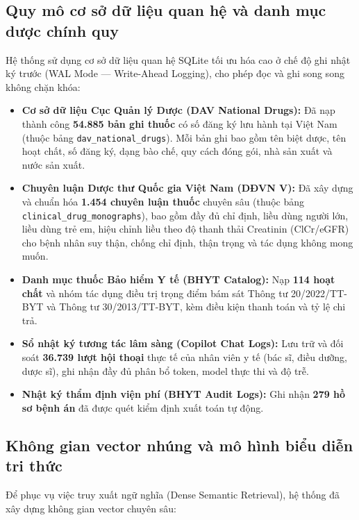 \documentclass[12pt,a4paper]{article}
\begin{document}
\subsection{Quy mô cơ sở dữ liệu quan hệ và danh mục dược chính quy}
Hệ thống sử dụng cơ sở dữ liệu quan hệ SQLite tối ưu hóa cao ở chế độ ghi nhật ký trước (WAL Mode --- Write-Ahead Logging), cho phép đọc và ghi song song không chặn khóa:

\begin{itemize}[leftmargin=1.5em]
    \item \textbf{Cơ sở dữ liệu Cục Quản lý Dược (DAV National Drugs):} Đã nạp thành công \textbf{54.885 bản ghi thuốc} có số đăng ký lưu hành tại Việt Nam (thuộc bảng \texttt{dav\_national\_drugs}). Mỗi bản ghi bao gồm tên biệt dược, tên hoạt chất, số đăng ký, dạng bào chế, quy cách đóng gói, nhà sản xuất và nước sản xuất.
    \item \textbf{Chuyên luận Dược thư Quốc gia Việt Nam (DĐVN V):} Đã xây dựng và chuẩn hóa \textbf{1.454 chuyên luận thuốc} chuyên sâu (thuộc bảng \texttt{clinical\_drug\_monographs}), bao gồm đầy đủ chỉ định, liều dùng người lớn, liều dùng trẻ em, hiệu chỉnh liều theo độ thanh thải Creatinin (ClCr/eGFR) cho bệnh nhân suy thận, chống chỉ định, thận trọng và tác dụng không mong muốn.
    \item \textbf{Danh mục thuốc Bảo hiểm Y tế (BHYT Catalog):} Nạp \textbf{114 hoạt chất} và nhóm tác dụng điều trị trọng điểm bám sát Thông tư 20/2022/TT-BYT và Thông tư 30/2013/TT-BYT, kèm điều kiện thanh toán và tỷ lệ chi trả.
    \item \textbf{Sổ nhật ký tương tác lâm sàng (Copilot Chat Logs):} Lưu trữ và đối soát \textbf{36.739 lượt hội thoại} thực tế của nhân viên y tế (bác sĩ, điều dưỡng, dược sĩ), ghi nhận đầy đủ phân bổ token, model thực thi và độ trễ.
    \item \textbf{Nhật ký thẩm định viện phí (BHYT Audit Logs):} Ghi nhận \textbf{279 hồ sơ bệnh án} đã được quét kiểm định xuất toán tự động.
\end{itemize}

\subsection{Không gian vector nhúng và mô hình biểu diễn tri thức}
Để phục vụ việc truy xuất ngữ nghĩa (Dense Semantic Retrieval), hệ thống đã xây dựng không gian vector chuyên sâu:
\end{document}

